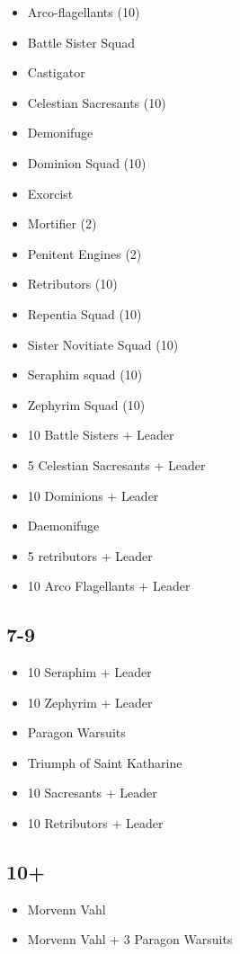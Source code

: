 \documentclass{HordeModeTarot}
\begin{document}
\begin{multicols}{2}
\begin{itemize}[leftmargin=*]
\item[] Arco-flagellants (10)
\item[] Battle Sister Squad
\item[] Castigator
\item[] Celestian Sacresants (10)
\item[] Demonifuge
\item[] Dominion Squad (10)
\item[] Exorcist
\item[] Mortifier (2)
\item[] Penitent Engines (2)
\item[] Retributors (10)
\item[] Repentia Squad (10)
\item[] Sister Novitiate Squad (10)
\item[] Seraphim squad (10)
\item[] Zephyrim Squad (10)
\item[] 10 Battle Sisters + Leader
\item[] 5 Celestian Sacresants + Leader
\item[] 10 Dominions + Leader
\item[] Daemonifuge
\item[] 5 retributors + Leader
\item[] 10 Arco Flagellants + Leader
\end{itemize}

\subsection*{7-9}

\begin{itemize}[leftmargin=*]
\item[] 10 Seraphim + Leader
\item[] 10 Zephyrim + Leader
\item[] Paragon Warsuits
\item[] Triumph of Saint Katharine
\item[] 10 Sacresants + Leader
\item[] 10 Retributors + Leader
\end{itemize}

\subsection*{10+}

\begin{itemize}[leftmargin=*]
\item[] Morvenn Vahl
\item[] Morvenn Vahl + 3 Paragon Warsuits
\end{itemize}



\end{multicols}
\end{document}
